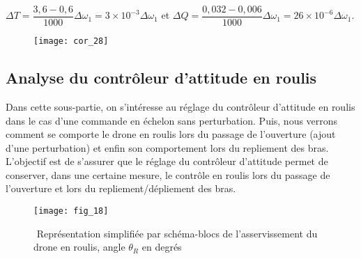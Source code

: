 \ifprof
\begin{corrige}
$\Delta T=\dfrac{3,6-0,6}{1000} \Delta \omega_1 =3\times 10^{-3} \Delta \omega_1$ et
$\Delta Q=\dfrac{0,032-0,006}{1000} \Delta \omega_1 =26\times 10^{-6} \Delta \omega_1$.

\begin{figure}[H]
\centering
\texttt{[image: cor\_28]}
\end{figure}

\end{corrige}
\else
\fi

\subsection{Analyse du contrôleur d’attitude en roulis}

\ifprof
\else
Dans cette sous-­partie, on s’intéresse au réglage du contrôleur d’attitude en roulis dans le
cas d’une commande en échelon sans perturbation. Puis, nous verrons comment se comporte le drone en roulis lors du passage de l’ouverture (ajout d’une perturbation) et enfin
son comportement lors du repliement des bras. L’objectif est de s’assurer que le réglage du
contrôleur d’attitude permet de conserver, dans une certaine mesure, le contrôle en roulis
lors du passage de l’ouverture et lors du repliement/dépliement des bras.

\begin{figure}[H]
\centering
\texttt{[image: fig\_18]}
\caption{\label{fig_ccinppsi2022:18} ­ Représentation simplifiée par schéma-blocs de l’asservissement du drone en
roulis, angle $\theta_R$ en degrés}
\end{figure}

